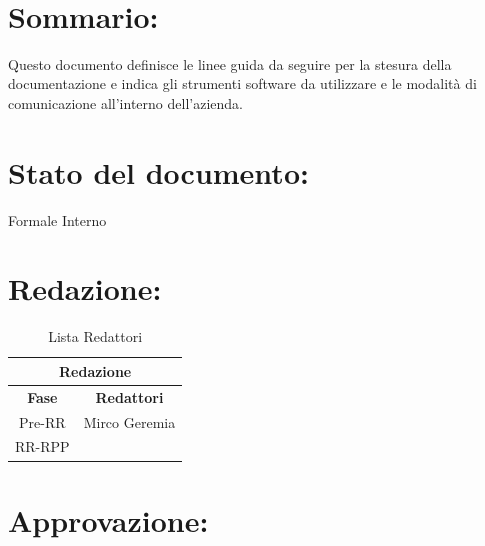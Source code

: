 \newpage

\begin{center} %
	\begin{Huge}	
				\textbf{\TITOLODOC}
			\\
	\end{Huge}
\end{center}

\section*{\LARGE Sommario:} %
\indent \indent
Questo documento definisce le linee guida da seguire per la stesura della documentazione e indica gli strumenti software da utilizzare e le modalit\`a di comunicazione all'interno dell'azienda.

\section*{\LARGE Stato del documento:}
\indent \indent
	Formale Interno

\section*{\LARGE Redazione:}
	\begin{table}[!h]
		\begin{center}
			\begin{tabular}
				{|c|c|}
				\hline
				\multicolumn{2}{|c|}{ \textbf{Redazione} } \\
				\hline
				\textbf{Fase} & \textbf{Redattori} \\
				\hline
				{Pre-RR} & Mirco Geremia \\
				\hline
				{RR-RPP} & \\
				\hline
			\end{tabular}
			\caption{Lista Redattori} %
			\label{tabredazione}
		\end{center}
	\end{table}
	
\section*{\LARGE Approvazione:}


